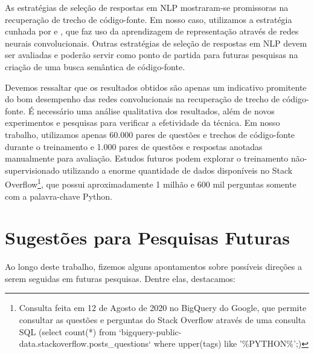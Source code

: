 As estratégias de seleção de respostas em NLP mostraram-se promissoras na recuperação de trecho de código-fonte. Em nosso caso, utilizamos a estratégia cunhada por  e , que faz uso da aprendizagem de representação através de redes neurais convolucionais. Outras estratégias de seleção de respostas em NLP devem ser avaliadas e poderão servir como ponto de partida para futuras pesquisas na criação de uma busca semântica de código-fonte.

Devemos ressaltar que os resultados obtidos são apenas um indicativo promitente do bom desempenho das redes convolucionais na recuperação de trecho de código-fonte. É necessário uma análise qualitativa dos resultados, além de novos experimentos e pesquisas para verificar a efetividade da técnica. Em nosso trabalho, utilizamos apenas 60.000 pares de questões e trechos de código-fonte durante o treinamento e 1.000 pares de questões e respostas anotadas manualmente para avaliação. Estudos futuros podem explorar o treinamento não-supervisionado utilizando a enorme quantidade de dados disponíveis no Stack Overflow\footnote{Consulta feita em 12 de Agosto de 2020 no BigQuery do Google, que permite consultar as questões e perguntas do Stack Overflow através de uma consulta SQL (select count(*) from `bigquery-public-data.stackoverflow.posts\_questions` where upper(tags) like '\%PYTHON\%';)}, que possui aproximadamente 1 milhão e 600 mil perguntas somente com a palavra-chave Python.



\section{Sugestões para Pesquisas Futuras} 

Ao longo deste trabalho, fizemos alguns apontamentos sobre possíveis direções a serem seguidas em futuras pesquisas. Dentre elas, destacamos:

